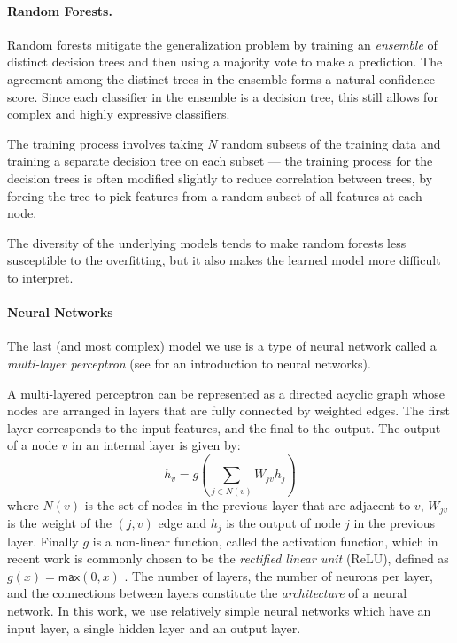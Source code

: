 \paragraph{Random Forests.} Random forests mitigate the generalization problem by training an {\em{ensemble}} of distinct decision trees and then using a majority vote to make a prediction. The agreement among the distinct trees in the ensemble forms a natural confidence score. Since each classifier in the ensemble is a decision tree, this still allows for complex and highly expressive classifiers. 

%
%
The training process involves taking $N$ random subsets of the training
data and training a separate decision tree on each subset --- the
training process for the decision trees is often modified slightly to
reduce correlation between trees, by forcing the tree to pick features
from a random subset of all features at each node.
%

The diversity of the underlying models tends to make random forests less
susceptible to the overfitting, but it
also makes the learned model more difficult to interpret.
%


\paragraph{Neural Networks}
The last (and most complex) model we use is a type of neural network
called a \emph{multi-layer perceptron} (see \citealt{Nielsen2015-pu} for
an introduction to neural networks).

A multi-layered perceptron can be represented as a directed acyclic graph whose nodes are arranged in layers that are fully connected by weighted edges. The first layer corresponds to the input features, and the final to the output. The output of a node $v$ in an internal layer is given by:
\[ h_v = g(\sum_{j \in N(v)} W_{jv} h_j ) \]
where $N(v)$ is the set of nodes in the previous layer that are adjacent to $v$, $W_{jv}$ is the weight of the $(j, v)$ edge and $h_j$ is the output of node $j$ in the previous layer. Finally $g$ is a non-linear function, called the activation function, which in recent work is commonly chosen to be the \emph{rectified linear unit} (ReLU),
defined as $g(x) = \mathsf{max}(0,x)$ \citep{Nair2010-xg}. The number of layers, the number of neurons per layer, and the connections between layers constitute the \emph{architecture} of a neural network. In this work, we use relatively simple neural networks which have an input layer, a single hidden layer and an output layer.


